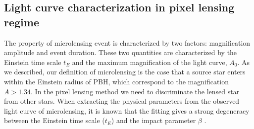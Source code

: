 \documentclass[iop, apj]{emulateapj}
\newcommand{\?}{\stackrel{?}{=}}
\begin{document}

\subsection{Light curve characterization in pixel lensing regime}
The property of microlensing event is characterized by two factors: magnification amplitude and event duration. These two quantities are characterized by the Einstein time scale $t_E$ and the maximum magnification of the light curve, $A_0$.
As we described, our definition of microlensing is the case that a source star enters within the Einstein radius of PBH, which correspond to the magnification $A>1.34$. In the pixel lensing method we need to discriminate the lensed star from other stars. 
When extracting the physical parameters from the observed light curve of microlensing, it is known that the fitting gives a strong degeneracy between the Einstein time scale ($t_E$) and the impact parameter $\beta$ \citep{Gould:96,BaltzSilk:00}. 
\end{document}
